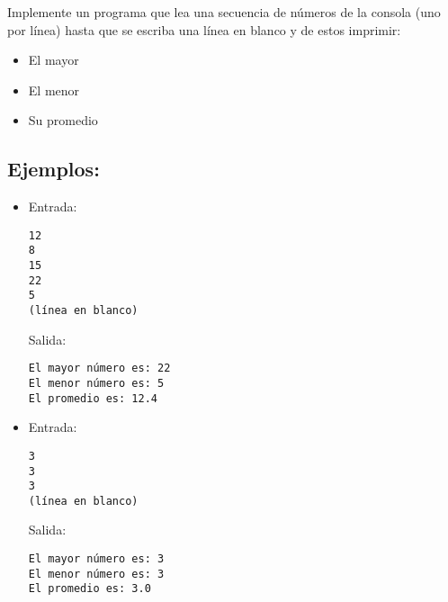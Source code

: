 Implemente un programa que lea una secuencia de números de la consola (uno por línea) hasta que se escriba una línea en blanco y de estos imprimir:
\begin{itemize}
    \item El mayor
    \item El menor
    \item Su promedio
\end{itemize}

\subsection*{Ejemplos:}
\begin{itemize}
    \item Entrada:
\begin{verbatim}
12
8
15
22
5
(línea en blanco)
\end{verbatim}
    Salida:
\begin{verbatim}
El mayor número es: 22
El menor número es: 5
El promedio es: 12.4
\end{verbatim}

    \item Entrada:
\begin{verbatim}
3
3
3
(línea en blanco)
\end{verbatim}
    Salida:
\begin{verbatim}
El mayor número es: 3
El menor número es: 3
El promedio es: 3.0
\end{verbatim}
\end{itemize}
